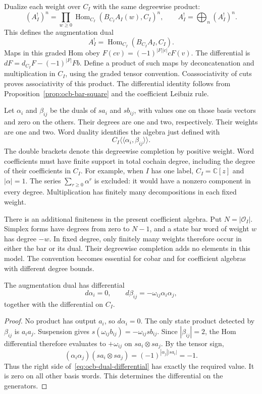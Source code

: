 Dualize each weight over $C_I$ with the same degreewise product:
\[
 (A_I^!)^n=\prod_{w\ge0}
 \operatorname{Hom}_{C_I}(B_{C_I}A_I(w),C_I)^n,
 \qquad A_I^!=\bigoplus_n(A_I^!)^n.
\]
This defines the augmentation dual
\[
 A_I^!=\operatorname{Hom}_{C_I}(B_{C_I}A_I,C_I).
\]
Maps in this graded Hom obey
$F(cv)=(-1)^{|F||c|}cF(v)$.
The differential is
$dF=d_{C_I}F-(-1)^{|F|}Fb$.
Define a product of such maps by deconcatenation and multiplication
in $C_I$, using the graded tensor convention.
Coassociativity of cuts proves associativity of this product.
The differential identity follows from
Proposition~\ref{prop:ocb-bar-square} and the coefficient Leibniz rule.

Let $\alpha_i$ and $\beta_{ij}$ be the duals of $sa_i$ and
$sb_{ij}$, with values one on those basis vectors and zero on the
others. Their degrees are one and two, respectively.
Their weights are one and two.
Word duality identifies the algebra just defined with
\[
 C_I\langle\!\langle\alpha_i,\beta_{ij}\rangle\!\rangle.
\]
The double brackets denote this degreewise completion by positive
weight. Word coefficients must have finite support in total cochain
degree, including the degree of their coefficients in $C_I$.
For example, when $I$ has one label, $C_I=\mathbb C[z]$ and
$|\alpha|=1$. The series $\sum_{r\ge0}\alpha^r$ is excluded:
it would have a nonzero component in every degree.
Multiplication has finitely many decompositions in each fixed weight.

There is an additional finiteness in the present coefficient algebra.
Put $N=|\mathcal O_I|$. Simplex forms have degrees from zero to
$N-1$, and a state bar word of weight $w$ has degree $-w$.
In fixed degree, only finitely many weights therefore occur in either
the bar or its dual. Their degreewise completion adds no elements
in this model. The convention becomes essential for cobar and for
coefficient algebras with different degree bounds.

\begin{proposition}\label{prop:ocb-dual-differential}
The augmentation dual has differential
\begin{equation}\label{eq:ocb-dual-differential}
 d\alpha_i=0,\qquad
 d\beta_{ij}=-\omega_{ij}\alpha_i\alpha_j,
\end{equation}
together with the differential on $C_I$.
\end{proposition}

\begin{proof}
No product has output $a_i$, so $d\alpha_i=0$.
The only state product detected by $\beta_{ij}$ is $a_i a_j$.
Suspension gives
$s(\omega_{ij}b_{ij})=-\omega_{ij}sb_{ij}$.
Since $|\beta_{ij}|=2$, the Hom differential therefore evaluates
to $+\omega_{ij}$ on $sa_i\otimes sa_j$.
By the tensor sign,
\[
 (\alpha_i\alpha_j)(sa_i\otimes sa_j)
 =(-1)^{|\alpha_j||sa_i|}=-1.
\]
Thus the right side of~\eqref{eq:ocb-dual-differential} has exactly
the required value. It is zero on all other basis words.
This determines the differential on the generators.
\end{proof}

